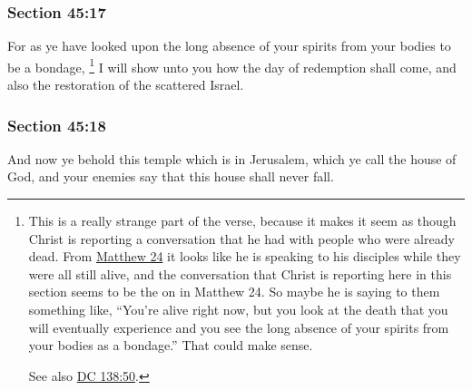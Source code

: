 	\subsubsection{Section 45:17} %
		\label{DC45-17}

		For as ye have looked upon the long absence of your spirits from your bodies to be a bondage,%
			\footnote{%
				This is a really strange part of the verse, because it makes it seem as though Christ is reporting a conversation that he had with people who were already dead. From \hyperref[MATTHEW-24]{Matthew 24} it looks like he is speaking to his disciples while they were all still alive, and the conversation that Christ is reporting here in this section seems to be the on in Matthew 24. So maybe he is saying to them something like, ``You're alive right now, but you look at the death that you will eventually experience and you see the long absence of your spirits from your bodies as a bondage.'' That could make sense.
				
				See also \hyperref[DC138-50]{DC 138:50}.
				}
		I will show unto you how the day of redemption shall come, and also the restoration of the scattered Israel.


	\subsubsection{Section 45:18} %
		\label{DC45-18}

		And now ye behold this temple which is in Jerusalem, which ye call the house of God, and your enemies say that this house shall never fall.


